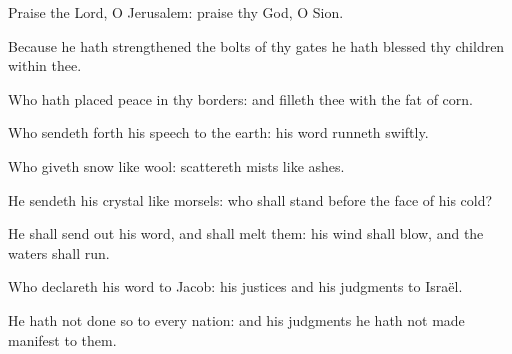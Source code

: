 ﻿\item Praise the Lord, O Je\-ru\-sa\-lem: praise thy God, O Sion. 
\item Because he hath strengthened the bolts of thy gates he hath blessed thy children within thee. 
\item Who hath placed peace in thy borders: and filleth thee with the fat of corn.
\item Who sendeth forth his speech to the earth: his word runneth swiftly.
\item Who giveth snow like wool: scattereth mists like ashes.
\item He sendeth his crystal like morsels: who shall stand before the face of his cold?
\item He shall send out his word, and shall melt them: his wind shall blow, and the waters shall run.
\item Who declareth his word to Jacob: his justices and his judgments to Israël.
\item He hath not done so to every nation: and his judgments he hath not made manifest to them.